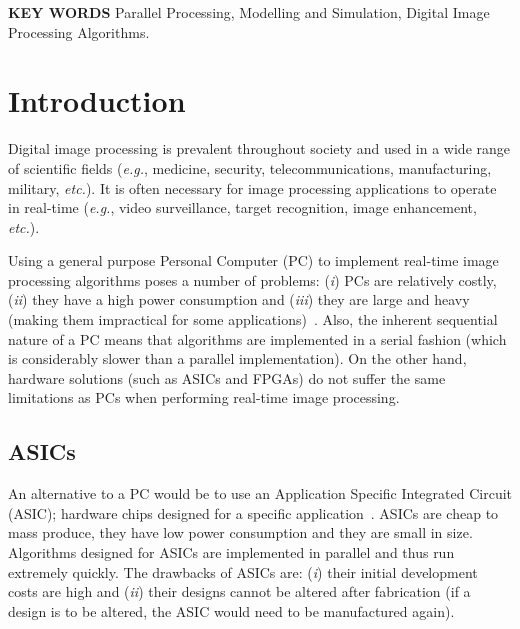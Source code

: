 \documentclass[10pt,twocolumn,letterpaper]{article}
\begin{document}
\noindent
{\bf\normalsize KEY WORDS}\newline
{Parallel Processing, Modelling and Simulation, Digital Image Processing Algorithms.}

\section{Introduction}
%
%
%
%
Digital image processing is prevalent throughout society and used in a wide
range of scientific fields (\emph{e.g.},
medicine, security, telecommunications, manufacturing, military, \emph{etc.}). 
It is often necessary for image processing applications to operate in real-time 
(\emph{e.g.}, video surveillance, target recognition, image enhancement, \emph{etc.}). 

Using a general purpose Personal Computer (PC) to implement real-time image processing algorithms 
poses a number of problems: (\emph{i}) PCs are relatively costly, (\emph{ii}) they have a high power consumption and (\emph{iii})
they are large and heavy (making them impractical for some applications)~\cite{johnson02}. Also, the inherent sequential nature 
of a PC means that algorithms are implemented in a serial fashion (which is considerably slower than a parallel implementation).
On the other hand, hardware solutions (such as ASICs and FPGAs) do not suffer the same limitations as PCs when performing real-time
image processing.

\subsection{ASICs}
An alternative to a PC would be to use an Application Specific Integrated Circuit (ASIC); hardware
chips designed for a specific application~\cite{bouri99}. ASICs are cheap to mass produce, they have low power consumption and they are small in size.
Algorithms designed for ASICs are implemented in parallel and thus run extremely quickly. 
The drawbacks of ASICs are: (\emph{i}) their initial development costs are high and (\emph{ii}) their designs
cannot be altered after fabrication (if a design is to be altered, the ASIC would need to be manufactured again).
\end{document}
